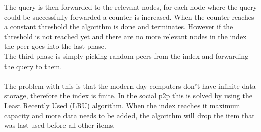 		The query is then forwarded to the relevant nodes, for each node where the query could be successfully forwarded a counter is increased.
		When the counter reaches a constant threshold the algorithm is done and terminates.
		However if the threshold is not reached yet and there are no more relevant nodes in the index the peer goes into the last phase.\\
		The third phase is simply picking random peers from the index and forwarding the query to them.\\
		\\
		The problem with this is that the modern day computers don't have infinite data storage, therefore the index is finite.
		In the social p2p this is solved by using the Least Recently Used (LRU) algorithm.
		When the index reaches it maximum capacity and more data needs to be added, the algorithm will drop the item that was last used before all other items.\\
		\\
		
		
		
		

{}
		
		